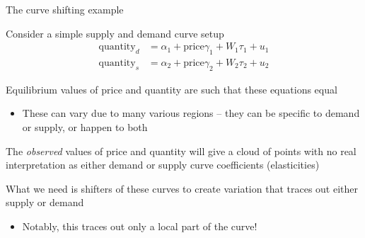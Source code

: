 \documentclass[notes,11pt, aspectratio=169]{beamer}
\newenvironment{wideitemize}{\itemize\addtolength{\itemsep}{10pt}}{\enditemize}
\begin{document}
\begin{frame}{The curve shifting example}
  \begin{wideitemize}
  \item Consider a simple supply and demand curve setup
    \begin{align}
      \text{quantity}_{d} &= \alpha_{1} + \text{price}\gamma_{1} + W_{1}\tau_{1} + u_{1}\\
      \text{quantity}_{s} &= \alpha_{2} + \text{price}\gamma_{2} + W_{2}\tau_{2} + u_{2}
    \end{align}
  \item Equilibrium values of price and quantity are such that these
    equations equal
    \begin{itemize}
    \item These can vary due to many various regions -- they can be
      specific to demand or supply, or happen to both
    \end{itemize}
  \item The \emph{observed} values of price and quantity will give a
    cloud of points with no real interpretation as either demand or
    supply curve coefficients (elasticities)

  \item What we need is shifters of these curves to create variation
    that traces out either supply or demand
    \begin{itemize}
    \item Notably, this traces out only a local part of the curve!
    \end{itemize}
  \end{wideitemize}
  
\end{frame}
\end{document}
